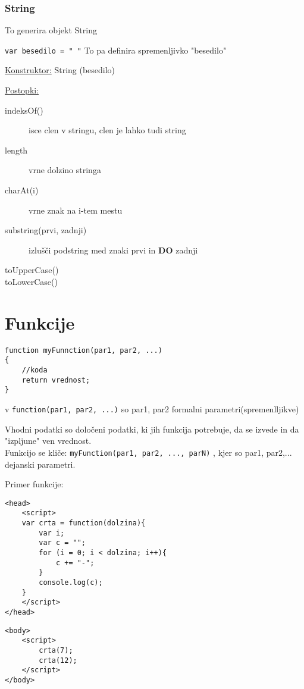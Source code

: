 \subsubsection*{String}


{\centering{}\par} To generira objekt String\

\texttt{var besedilo = " "} To pa definira spremenljivko "besedilo"\

\underline{Konstruktor:} String (besedilo)


\underline{Postopki:}

\begin{description}
	\item[indeksOf()] isce clen v stringu, clen je lahko tudi string
	\item[length] vrne dolzino stringa
	\item[charAt(i)] vrne znak na i-tem mestu
	\item[substring(prvi, zadnji)] izlušči podstring med znaki prvi in  \textbf{DO} zadnji
	\item[toUpperCase()]
	\item[toLowerCase()]
\end{description}
\newpage
\section{Funkcije}

\begin{verbatim}
function myFunnction(par1, par2, ...)
{
    //koda
    return vrednost;
}
\end{verbatim}

v \texttt{function(par1, par2, ...)} so par1, par2 formalni parametri(spremenlljikve)
 
Vhodni podatki so določeni podatki, ki jih funkcija potrebuje, da se izvede in da "izpljune" ven vrednost.\\

Funkcijo se kliče: \texttt{myFunction(par1, par2, ..., parN)} , kjer so par1, par2,... dejanski parametri.

Primer funkcije:

\begin{verbatim}
<head>
    <script>
    var crta = function(dolzina){
        var i;
        var c = "";
        for (i = 0; i < dolzina; i++){
            c += "-";
        }
        console.log(c);
    }
    </script>
</head>
\end{verbatim}
\begin{verbatim}
<body>
    <script>
        crta(7);
        crta(12);
    </script>
</body>
\end{verbatim}

